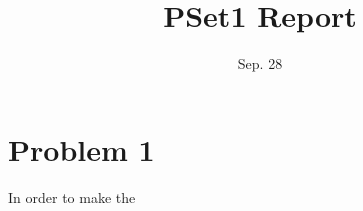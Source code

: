 \documentclass[12pt]{article}
\title{PSet1 Report}
\date{Sep. 28}
\begin{document}
    \maketitle
    \section{Problem 1}
    In order to make the 
\end{document}
